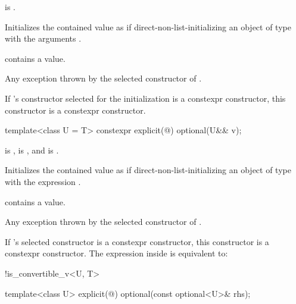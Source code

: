 \begin{itemdescr}
\pnum
\constraints
{} is .

\pnum
\effects
Initializes the contained value as if direct-non-list-initializing an object of type  with the arguments .

\pnum
\ensures
{} contains a value.

\pnum
\throws
Any exception thrown by the selected constructor of .

\pnum
\remarks
If 's constructor selected for the initialization is a constexpr constructor, this constructor is a constexpr constructor.
\end{itemdescr}

%
\begin{itemdecl}
template<class U = T> constexpr explicit(@\seebelow@) optional(U&& v);
\end{itemdecl}

\begin{itemdescr}
\pnum
\constraints
{} is ,
 is , and
 is .

\pnum
\effects
Initializes the contained value as if direct-non-list-initializing
an object of type  with the expression .

\pnum
\ensures
{} contains a value.

\pnum
\throws
Any exception thrown by the selected constructor of .

\pnum
\remarks
If 's selected constructor is a constexpr constructor,
this constructor is a constexpr constructor.
The expression inside  is equivalent to:
\begin{codeblock}
!is_convertible_v<U, T>
\end{codeblock}
\end{itemdescr}

%
\begin{itemdecl}
template<class U> explicit(@\seebelow@) optional(const optional<U>& rhs);
\end{itemdecl}

